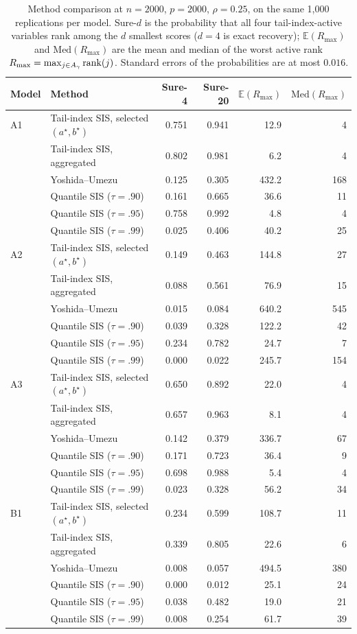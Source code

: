 \begin{table}[t]
\centering
\caption{Method comparison at $n=2000$, $p=2000$, $\rho=0.25$, on the same 1{,}000 replications per model. Sure-$d$ is the probability that all four tail-index-active variables rank among the $d$ smallest scores ($d=4$ is exact recovery); $\mathbb{E}(R_{\max})$ and $\mathrm{Med}(R_{\max})$ are the mean and median of the worst active rank $R_{\max}=\max_{j\in A_\gamma}\mathrm{rank}(j)$. Standard errors of the probabilities are at most $0.016$.}
\label{tab:cmp2000}
\begin{tabular}{llrrrr}
\toprule
Model & Method & Sure-4 & Sure-20 & $\mathbb{E}(R_{\max})$ & $\mathrm{Med}(R_{\max})$\\
\midrule
A1 & Tail-index SIS, selected $(a^\star,b^\star)$ & 0.751 & 0.941 & 12.9 & 4\\
 & Tail-index SIS, aggregated & 0.802 & 0.981 & 6.2 & 4\\
 & Yoshida--Umezu & 0.125 & 0.305 & 432.2 & 168\\
 & Quantile SIS ($\tau=.90$) & 0.161 & 0.665 & 36.6 & 11\\
 & Quantile SIS ($\tau=.95$) & 0.758 & 0.992 & 4.8 & 4\\
 & Quantile SIS ($\tau=.99$) & 0.025 & 0.406 & 40.2 & 25\\
\addlinespace
A2 & Tail-index SIS, selected $(a^\star,b^\star)$ & 0.149 & 0.463 & 144.8 & 27\\
 & Tail-index SIS, aggregated & 0.088 & 0.561 & 76.9 & 15\\
 & Yoshida--Umezu & 0.015 & 0.084 & 640.2 & 545\\
 & Quantile SIS ($\tau=.90$) & 0.039 & 0.328 & 122.2 & 42\\
 & Quantile SIS ($\tau=.95$) & 0.234 & 0.782 & 24.7 & 7\\
 & Quantile SIS ($\tau=.99$) & 0.000 & 0.022 & 245.7 & 154\\
\addlinespace
A3 & Tail-index SIS, selected $(a^\star,b^\star)$ & 0.650 & 0.892 & 22.0 & 4\\
 & Tail-index SIS, aggregated & 0.657 & 0.963 & 8.1 & 4\\
 & Yoshida--Umezu & 0.142 & 0.379 & 336.7 & 67\\
 & Quantile SIS ($\tau=.90$) & 0.171 & 0.723 & 36.4 & 9\\
 & Quantile SIS ($\tau=.95$) & 0.698 & 0.988 & 5.4 & 4\\
 & Quantile SIS ($\tau=.99$) & 0.023 & 0.328 & 56.2 & 34\\
\addlinespace
B1 & Tail-index SIS, selected $(a^\star,b^\star)$ & 0.234 & 0.599 & 108.7 & 11\\
 & Tail-index SIS, aggregated & 0.339 & 0.805 & 22.6 & 6\\
 & Yoshida--Umezu & 0.008 & 0.057 & 494.5 & 380\\
 & Quantile SIS ($\tau=.90$) & 0.000 & 0.012 & 25.1 & 24\\
 & Quantile SIS ($\tau=.95$) & 0.038 & 0.482 & 19.0 & 21\\
 & Quantile SIS ($\tau=.99$) & 0.008 & 0.254 & 61.7 & 39\\
\bottomrule
\end{tabular}
\end{table}
